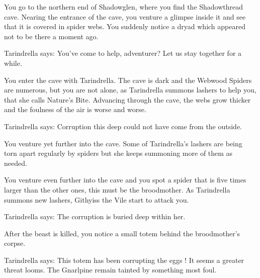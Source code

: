 You go to the northern end of Shadowglen, where you find the Shadowthread cave. Nearing the entrance of the cave, you venture a glimpse inside it and see that it is covered in spider webs. You suddenly notice a dryad which appeared not to be there a moment ago. %

Tarindrella says: You've come to help, adventurer? Let us stay together for a while.



You enter the cave with Tarindrella. The cave is dark and the Webwood Spiders are numerous, but you are not alone, as Tarindrella summons lashers to help you, that she calls Nature's Bite. Advancing through the cave, the webs grow thicker and the foulness of the air is worse and worse. %

Tarindrella says: Corruption this deep could not have come from the outside.

You venture yet further into the cave. Some of Tarindrella's lashers are being torn apart regularly by spiders but she keeps summoning more of them as needed.



You venture even further into the cave and you spot a spider that is five times larger than the other ones, this must be the broodmother. As Tarindrella summons new lashers, Githyiss the Vile start to attack you.

Tarindrella says: The corruption is buried deep within her.

After the beast is killed, you notice a small totem behind the broodmother's corpse.

Tarindrella says: This totem has been corrupting the eggs ! It seems a greater threat looms. The Gnarlpine remain tainted by something most foul.


